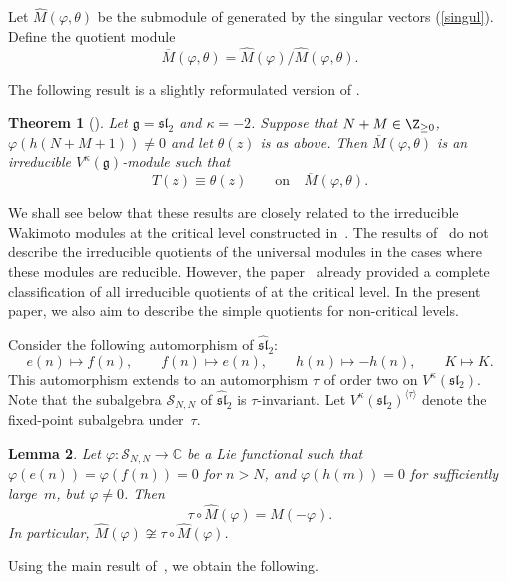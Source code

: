 \documentclass[10pt,a4paper]{amsart}
\numberwithin{equation}{section}
\newtheorem{Theorem}{Theorem}[section]
\newtheorem{Lemma}[Theorem]{Lemma}
\theoremstyle{definition}
\newcommand{\1}{\textbf{1}}
\begin{document}
Let $\widehat{M}(\varphi, \theta)$ be the submodule of  generated by the singular vectors (\ref{singul}). Define the quotient module
 \[ \overline M(\varphi, \theta) = \widehat M(\varphi)/ \widehat{M}(\varphi, \theta). \]

The following result is a slightly reformulated version of \cite[Theorem 1.2]{FGXZ}.

\begin{Theorem}[\cite{FGXZ}]\label{fgxz-critical}
Let $\mathfrak{g} = \mathfrak{sl}_{2}$ and $\kappa = -2$.
Suppose that $N+ M \in {\Z}_{\ge 0}$, $\varphi(h(N + M + 1)) \ne 0$ and let $\theta(z)$ is as above. Then
 $\overline{M}(\varphi, \theta)
$
is an irreducible $V^{\kappa}(\mathfrak{g})$-module such that
 \[ T(z) \equiv \theta(z) \qquad \mbox{on} \quad \overline{M}(\varphi, \theta).\]
\end{Theorem}

We shall see below that these results are closely related to the irreducible Wakimoto modules
at the critical level constructed in~\cite{A-07, A-14}.
The results of~\cite{FGXZ} do not describe the irreducible quotients of the universal modules
 in the cases where these modules are reducible.
However, the paper~\cite{A-14} already provided a complete classification of all irreducible quotients
of  at the critical level.
In the present paper, we also aim to describe the simple quotients for non-critical levels.

Consider the following automorphism of $\widehat{\mathfrak{sl}}_{2}$:
\[
 e(n) \mapsto f(n), \qquad
 f(n) \mapsto e(n), \qquad
 h(n) \mapsto -h(n), \qquad
 K \mapsto K.
\]
This automorphism extends to an automorphism $\tau$ of order two on $V^{\kappa}(\mathfrak{sl}_{2})$.
Note that the subalgebra $\mathcal{S}_{N,N}$ of $\widehat{\mathfrak{sl}}_{2}$ is $\tau$-invariant.
Let $V^{\kappa}(\mathfrak{sl}_{2})^{\langle \tau \rangle}$ denote the fixed-point subalgebra under~$\tau$.


\begin{Lemma}
Let $\varphi \colon \mathcal{S}_{N,N} \to \mathbb{C}$ be a Lie functional such that
$\varphi(e(n)) = \varphi(f(n)) = 0$ for $n > N$,
and $\varphi(h(m)) = 0$ for sufficiently large~$m$, but $\varphi \ne 0$.
Then
\[
 \tau \circ \widehat{M}(\varphi) = \widehat{M}(-\varphi).
\]
In particular, $\widehat{M}(\varphi) \not\cong \tau \circ \widehat{M}(\varphi)$.
\end{Lemma}

Using the main result of~\cite{ALPY}, we obtain the following.
\end{document}
